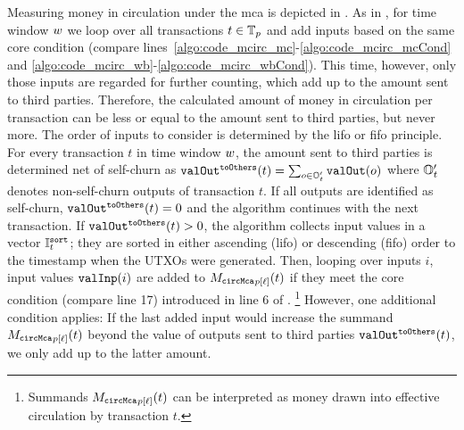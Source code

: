 Measuring money in circulation under the \ac{mca} is depicted in
.  %
%
As in , for time window ${w}$ we loop over all
transactions $t\in{\mathbb{T}_{p}}$ and add inputs based on the same core condition
(compare lines~\ref{algo:code_mcirc_mc}-\ref{algo:code_mcirc_mcCond} and
\ref{algo:code_mcirc_wb}-\ref{algo:code_mcirc_wbCond}).  %
This time, however, only those inputs are regarded for further counting,
which add up to the amount sent to third parties. Therefore, the calculated
amount of money in circulation per transaction can be less or equal to the
amount sent to third parties, but never more.
The order of inputs to consider is determined by the \ac{lifo} or \ac{fifo}
principle.  %
For every transaction $t$ in time window ${w}$, the amount sent to third
parties is determined net of self-churn as
${\mathtt{valOut}}^{\mathtt{toOthers}}(t) = \sum_{o\in{}{\mathbb{O}}'_{t}} {\mathtt{valOut}}(o)$ %
where ${\mathbb{O}}'_{t}$ denotes non-self-churn outputs of transaction $t$.  %
If all outputs are identified as self-churn, ${\mathtt{valOut}}^{\mathtt{toOthers}}(t) = 0$ and
the algorithm continues with the next transaction.  %
%
If ${\mathtt{valOut}}^{\mathtt{toOthers}}(t) > 0$, the algorithm collects input values in a
vector ${\mathbb{I}^{\mathtt{sort}}_{t}}$; they are sorted in either ascending (\ac{lifo}) or
descending (\ac{fifo}) order \wrt to the timestamp when the UTXOs were
generated.  %
Then, looping over inputs $i$, input values ${\mathtt{valInp}}(i)$ are added to
${{M_{\mathtt{circMca}}}_{{p}[{\ell}]}}(t)$ if they meet the core condition (compare line 17) introduced
in line 6 of .  %
\footnote{Summands ${{M_{\mathtt{circMca}}}_{{p}[{\ell}]}}(t)$ can be interpreted as money drawn into
  effective circulation by transaction $t$.} %
However, one additional condition applies: If the last added input would
increase the summand ${{M_{\mathtt{circMca}}}_{{p}[{\ell}]}}(t)$ beyond the value of outputs sent to
third parties ${\mathtt{valOut}}^{\mathtt{toOthers}}(t)$, we only add up to the latter
amount.  %




